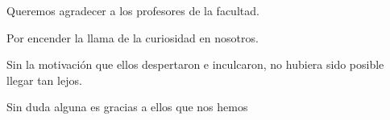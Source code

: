\begin{acknowledgements}
	Queremos agradecer a los profesores de la facultad.

	Por encender la llama de la curiosidad en nosotros.

	Sin la motivación que ellos despertaron e inculcaron, no hubiera sido posible llegar tan lejos.

	Sin duda alguna es gracias a ellos que nos hemos 
 
\end{acknowledgements}
